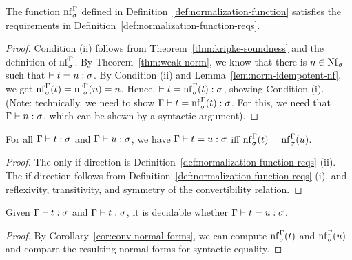\begin{thm} \label{thm:norm-fun-correctness}
The function $\mathrm{nf}^{\Gamma}_{\sigma}$ defined in Definition~\ref{def:normalization-function} satisfies the requirements in Definition~\ref{def:normalization-function-reqs}.
\begin{proof}
Condition (ii) follows from Theorem~\ref{thm:kripke-soundness} and the definition of $\mathrm{nf}^{\Gamma}_{\sigma}$. By Theorem~\ref{thm:weak-norm}, we know that there is $n \in \Nf[\sigma]$ such that $\vdash t = n : \sigma$. By Condition (ii) and Lemma~\ref{lem:norm-idempotent-nf}, we get $\mathrm{nf}^{\Gamma}_{\sigma}(t) = \mathrm{nf}^{\Gamma}_{\sigma}(n) = n$. Hence, $\vdash t = \mathrm{nf}^{\Gamma}_{\sigma}(t) : \sigma$, showing Condition (i).
(Note: technically, we need to show $\Gamma \vdash t = \mathrm{nf}^{\Gamma}_{\sigma}(t) : \sigma$. For this, we need that $\Gamma \vdash n : \sigma$, which can be shown by a syntactic argument).
\end{proof}
\end{thm}

\begin{cor} \label{cor:conv-normal-forms}
For all $\Gamma \vdash t : \sigma$ and $\Gamma \vdash u : \sigma$, we have $\Gamma \vdash t = u : \sigma$ iff $\mathrm{nf}^{\Gamma}_{\sigma}(t) = \mathrm{nf}^{\Gamma}_{\sigma}(u)$.
\begin{proof}
The only if direction is Definition~\ref{def:normalization-function-reqs} (ii). The if direction follows from Definition~\ref{def:normalization-function-reqs} (i), and reflexivity, transitivity, and symmetry of the convertibility relation.
\end{proof}
\end{cor}

\begin{cor} \label{cor:conv-dec}
Given $\Gamma \vdash t : \sigma$ and $\Gamma \vdash t : \sigma$, it is decidable whether $\Gamma \vdash t = u : \sigma$.
\begin{proof}
By Corollary~\ref{cor:conv-normal-forms}, we can compute $\mathrm{nf}^{\Gamma}_{\sigma}(t)$ and $\mathrm{nf}^{\Gamma}_{\sigma}(u)$ and compare the resulting normal forms for syntactic equality.
\end{proof}
\end{cor}

